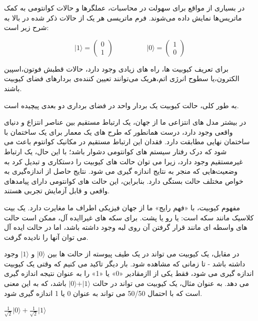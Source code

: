 \documentclass{book}
\begin{document}
در بسیاری از مواقع برای سهولت در محاسبات، عملگر‌ها و حالات کوانتومی به کمک ماتریس‌ها نمایش داده ‌می‌شوند. فرم ماتریسی هر یک از حالات ذکر شده در بالا به شرح زیر است:

\begin{equation}
	\vert 1 \rangle = \begin{pmatrix} 0 \\ 1 \end{pmatrix}
	\hspace{2cm}
	\vert 0 \rangle = \begin{pmatrix} 1 \\ 0 \end{pmatrix}	
\end{equation}

برای تعریف کیوبیت ها، راه های زیادی وجود دارد، حالات قطبش فوتون،‌اسپین الکترون،‌یا سطوح انرژی اتم،‌هریک می‌توانند تعیین کننده‌ی بردار‌های فضای کیوبیت باشند.

 به طور کلی، حالت کیوبیت یک بردار واحد در فضای برداری دو بعدی پیچیده است.\pagebreak
 
در بیشتر مدل های انتزاعی ما از جهان، یک ارتباط مستقیم بین عناصر انتزاع و دنیای واقعی وجود دارد، درست همانطور که طرح های یک معمار برای یک ساختمان با ساختمان نهایی مطابقت دارد. فقدان این ارتباط مستقیم در مکانیک کوانتوم باعث می شود که درک رفتار سیستم های کوانتومی دشوار باشد؛ با این حال، یک ارتباط غیرمستقیم وجود دارد، زیرا می توان حالت های کیوبیت را دستکاری و تبدیل کرد به وضعیت‌هایی که منجر به نتایج اندازه گیری می شود. نتایج حاصل از اندازه‌گیری به خواص مختلف حالت بستگی دارد. بنابراین، این حالت های کوانتومی دارای پیامدهای واقعی و قابل آزمایش تجربی هستند.

مفهوم کیوبیت، با «فهم رایج» ما از جهان فیزیکی اطراف ما مغایرت دارد. یک بیت کلاسیک مانند سکه است: یا رو یا پشت. برای سکه های غیراایده آل، ممکن است حالت های واسطه ای مانند قرار گرفتن آن روی لبه وجود داشته باشد، اما در حالت ایده آل می توان آنها را نادیده گرفت. 

در مقابل، یک کیوبیت می تواند در یک طیف پیوسته از حالت ها بین $\vert0\rangle$ و $\vert1\rangle$ وجود داشته باشد - تا زمانی که مشاهده شود. بار دیگر تاکید می کنیم که وقتی یک کیوبیت اندازه گیری می شود، فقط یکی از اازمقادیر «0» یا «1» را به عنوان نتیجه اندازه گیری می دهد. به عنوان مثال، یک کیوبیت می تواند در حالت
 $\vert0\rangle + \vert1\rangle$ باشد، که به این معنی است که با احتمال 50/50 می تواند به عنوان 0 یا 1 اندازه گیری شود.


\begin{center}
	$\frac{1}{\sqrt{2}} \vert 0\rangle + \frac{1}{\sqrt{2}} \vert 1\rangle$
\end{center}
\end{document}
